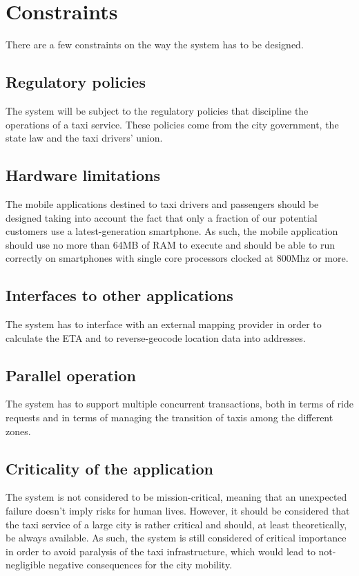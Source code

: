 \section{Constraints}
There are a few constraints on the way the system has to be designed. 
\subsection{Regulatory policies}
The system will be subject to the regulatory policies that discipline the operations of a taxi service. These policies come from the city government, the state law and the taxi drivers’ union. 
\subsection{Hardware limitations}
The mobile applications destined to taxi drivers and passengers should be designed taking into account the fact that only a fraction of our potential customers use a latest-generation smartphone. As such, the mobile application should use no more than 64MB of RAM to execute and should be able to run correctly on smartphones with single core processors clocked at 800Mhz or more.
\subsection{Interfaces to other applications}
The system has to interface with an external mapping provider in order to calculate the ETA and to reverse-geocode location data into addresses.
\subsection{Parallel operation}
The system has to support multiple concurrent transactions, both in terms of ride requests and in terms of managing the transition of taxis among the different zones. 
\subsection{Criticality of the application}
The system is not considered to be mission-critical, meaning that an unexpected failure doesn’t imply risks for human lives. 
However, it should be considered that the taxi service of a large city is rather critical and should, at least theoretically, be always available. As such, the system is still considered of critical importance in order to avoid paralysis of the taxi infrastructure, which would lead to not-negligible negative consequences for the city mobility.
